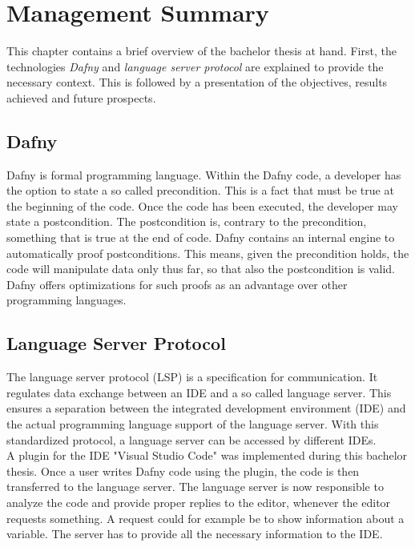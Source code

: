 \section{Management Summary}
\label{section:management_summary}
This chapter contains a brief overview of the bachelor thesis at hand.
First, the technologies \textit{Dafny} and \textit{language server protocol} are explained to provide the necessary context.
This is followed by a presentation of the objectives, results achieved and future prospects.

\subsection{Dafny}
\label{section:management_summary:dafny}
Dafny is formal programming language.
Within the Dafny code, a developer has the option to state a so called precondition.
This is a fact that must be true at the beginning of the code.
Once the code has been executed, the developer may state a postcondition.
The postcondition is, contrary to the precondition, something that is true at the end of code.
Dafny contains an internal engine to automatically proof postconditions.
This means, given the precondition holds, the code will manipulate data only thus far, so that also the postcondition is valid.
Dafny offers optimizations for such proofs as an advantage over other programming languages.

\subsection{Language Server Protocol}
The language server protocol (LSP) is a specification for communication.
It regulates data exchange between an IDE and a so called language server.
This ensures a separation between the integrated development environment (IDE) and the actual programming language support of the language server.
With this standardized protocol, a language server can be accessed by different IDEs. \\

A plugin for the IDE "Visual Studio Code" was implemented during this bachelor thesis.
Once a user writes Dafny code using the plugin, the code is then transferred to the language server.
The language server is now responsible to analyze the code and provide proper replies to the editor, whenever the editor requests something.
A request could for example be to show information about a variable.
The server has to provide all the necessary information to the IDE.\\

